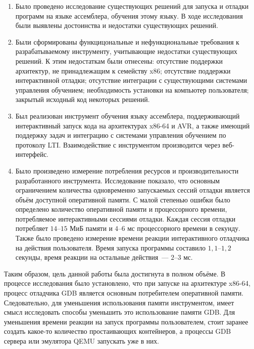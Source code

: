 \documentclass[a4paper,article,14pt]{extarticle}
\begin{document}
\begin{enumerate}
    \item Было проведено исследование существующих решений для запуска и отладки программ на языке ассемблера, обучения этому языку. В ходе исследования были выявлены достоинства и недостатки существующих решений.
    \item Были сформированы функцицональные и нефункциональные требования к разрабатываемому инструменту, учитывающие недостатки существующих решений. К этим недостаткам были отнесены: отсутствие поддержки архитектур, не принадлежащим к семейству x86; отсутствие поддержки интерактивной отладки; отсутствие интеграции с существующими системами управления обучением; необходимость установки на компьютер пользователя; закрытый исходный код некоторых решений.
    \item Был реализован инструмент обучения языку ассемблера, поддерживающий интерактивный запуск кода на архитектурах x86-64 и AVR, а также имеющий поддержку задач и интеграцию с системами управления обучением по протоколу LTI. Взаимодействие с инструментом производится через веб-интерфейс.
    \item Было произведено измерение потребления ресурсов и производительности разработанного инструмента. Исследование показало, что основным ограничением количества одновременно запускаемых сессий отладки является объём доступной оперативной памяти. С малой степенью ошибки было определено количество оперативной памяти и процессорного времени, потребляемое интерактивными сессиями отладки. Каждая сессия отладки потребляет $14$--$15$ МиБ памяти и $4$--$6$ мс процессорного времени в секунду. Также было проведено измерение времени реакции интерактивного отладчика на действия пользователя. Время запуска программы составило $1{,}1$--$1{,}2$ секунды, время реакции на остальные действия~--- $2$--$3$ мс.
\end{enumerate}

Таким образом, цель данной работы была достигнута в полном объёме. В процессе исследования было установлено, что при запуске на архитектуре x86-64, процесс отладчика GDB является основным потребителем оперативной памяти. Следовательно, для уменьшения использования памяти инструментом, имеет смысл исследовать способы уменьшить это использование памяти GDB. Для уменьшения времени реакции на запуск программы пользователем, стоит заранее создать какое-то количество простаивающих контейнеров, а процессы GDB сервера или эмулятора QEMU запускать уже в них.

\pagebreak
\begin{thebibliography}{1}
\printbibliography[heading=none]
\end{thebibliography}
\end{document}

